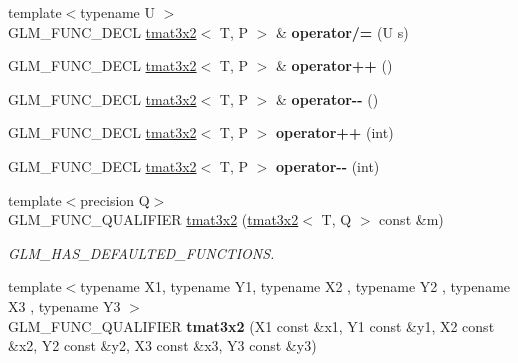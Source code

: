 \begin{DoxyCompactItemize}
\item 
\hypertarget{structglm_1_1tmat3x2_a824a792e163b060114a4df6f1de292a9}{{\footnotesize template$<$typename U $>$ }\\G\-L\-M\-\_\-\-F\-U\-N\-C\-\_\-\-D\-E\-C\-L \hyperlink{structglm_1_1tmat3x2}{tmat3x2}$<$ T, P $>$ \& {\bfseries operator/=} (U s)}\label{structglm_1_1tmat3x2_a824a792e163b060114a4df6f1de292a9}

\item 
\hypertarget{structglm_1_1tmat3x2_a8ef0fdf574941e87f0e7da6b36304f97}{G\-L\-M\-\_\-\-F\-U\-N\-C\-\_\-\-D\-E\-C\-L \hyperlink{structglm_1_1tmat3x2}{tmat3x2}$<$ T, P $>$ \& {\bfseries operator++} ()}\label{structglm_1_1tmat3x2_a8ef0fdf574941e87f0e7da6b36304f97}

\item 
\hypertarget{structglm_1_1tmat3x2_a655f4f20c013de86c872da9a60183b05}{G\-L\-M\-\_\-\-F\-U\-N\-C\-\_\-\-D\-E\-C\-L \hyperlink{structglm_1_1tmat3x2}{tmat3x2}$<$ T, P $>$ \& {\bfseries operator-\/-\/} ()}\label{structglm_1_1tmat3x2_a655f4f20c013de86c872da9a60183b05}

\item 
\hypertarget{structglm_1_1tmat3x2_a70f90e05d9c13d7145369d4e3ebf7184}{G\-L\-M\-\_\-\-F\-U\-N\-C\-\_\-\-D\-E\-C\-L \hyperlink{structglm_1_1tmat3x2}{tmat3x2}$<$ T, P $>$ {\bfseries operator++} (int)}\label{structglm_1_1tmat3x2_a70f90e05d9c13d7145369d4e3ebf7184}

\item 
\hypertarget{structglm_1_1tmat3x2_a79b323eca5c708e456e2675586895444}{G\-L\-M\-\_\-\-F\-U\-N\-C\-\_\-\-D\-E\-C\-L \hyperlink{structglm_1_1tmat3x2}{tmat3x2}$<$ T, P $>$ {\bfseries operator-\/-\/} (int)}\label{structglm_1_1tmat3x2_a79b323eca5c708e456e2675586895444}

\item 
\hypertarget{structglm_1_1tmat3x2_a5c9661d554c44cfa3db4ca95c5fd553a}{{\footnotesize template$<$precision Q$>$ }\\G\-L\-M\-\_\-\-F\-U\-N\-C\-\_\-\-Q\-U\-A\-L\-I\-F\-I\-E\-R \hyperlink{structglm_1_1tmat3x2_a5c9661d554c44cfa3db4ca95c5fd553a}{tmat3x2} (\hyperlink{structglm_1_1tmat3x2}{tmat3x2}$<$ T, Q $>$ const \&m)}\label{structglm_1_1tmat3x2_a5c9661d554c44cfa3db4ca95c5fd553a}

\begin{DoxyCompactList}\small\item\em G\-L\-M\-\_\-\-H\-A\-S\-\_\-\-D\-E\-F\-A\-U\-L\-T\-E\-D\-\_\-\-F\-U\-N\-C\-T\-I\-O\-N\-S. \end{DoxyCompactList}\item 
\hypertarget{structglm_1_1tmat3x2_ad881522add5eb4878fc1368ffbaabbe5}{{\footnotesize template$<$typename X1, typename Y1, typename X2 , typename Y2 , typename X3 , typename Y3 $>$ }\\G\-L\-M\-\_\-\-F\-U\-N\-C\-\_\-\-Q\-U\-A\-L\-I\-F\-I\-E\-R {\bfseries tmat3x2} (X1 const \&x1, Y1 const \&y1, X2 const \&x2, Y2 const \&y2, X3 const \&x3, Y3 const \&y3)}\label{structglm_1_1tmat3x2_ad881522add5eb4878fc1368ffbaabbe5}


\end{DoxyCompactItemize}
